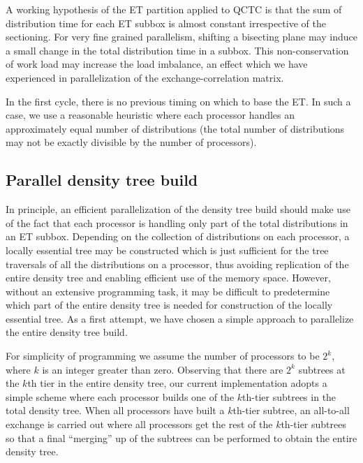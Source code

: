 \commentoutA{\documentclass[prl,aps,twocolumn,twocolumngrid,superbib]{revtex4}}
\begin{document}
A working hypothesis of the ET partition applied to QCTC is that the
sum of distribution time for each ET subbox is almost constant
irrespective of the sectioning. For very fine grained parallelism,
shifting a bisecting plane may induce a small change in the total
distribution time in a subbox.  This non-conservation of work load may
increase the load imbalance, an effect which we have experienced in
parallelization of the exchange-correlation matrix\cite{CGan03}.

In the first cycle, there is no previous timing on which to base the
ET. In such a case, we use a reasonable heuristic where each processor
handles an approximately equal number of distributions (the total
number of distributions may not be exactly divisible by the number of
processors).

\subsection{Parallel density tree build} 
\label{sec:parallelTB}

In principle, an efficient parallelization of the density tree build
should make use of the fact that each processor is handling only part
of the total distributions in an ET subbox.  Depending on the
collection of distributions on each processor, a locally essential
tree may be constructed which is just sufficient for the tree
traversals of all the distributions on a
processor\cite{MWarren92,CGan03}, thus avoiding replication of the
entire density tree and enabling efficient use of the memory space.
However, without an extensive programming task, it may be difficult to
predetermine which part of the entire density tree is needed for
construction of the locally essential tree. As a first attempt, we
have chosen a simple approach to parallelize the entire density tree
build.

For simplicity of programming we assume the number of processors to be
$2^k$, where $k$ is an integer greater than zero.  Observing that
there are $2^k$ subtrees at the $k$th tier in the entire density tree,
our current implementation adopts a simple scheme where each processor
builds one of the $k$th-tier subtrees in the total density tree. When
all processors have built a $k$th-tier subtree, an all-to-all exchange
is carried out where all processors get the rest of the $k$th-tier
subtrees so that a final ``merging'' up of the
subtrees\cite{MChallacombe97,CTymczak04a} can be performed to obtain
the entire density tree.
\end{document}
